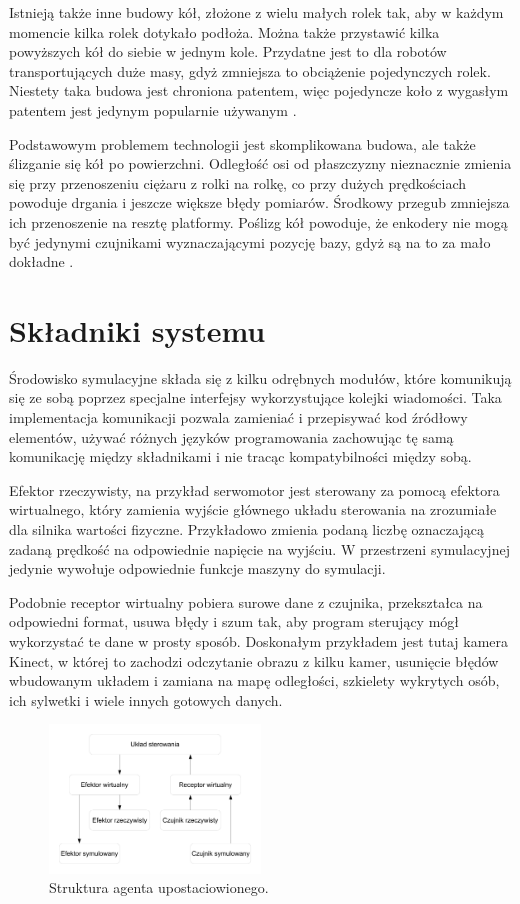 Istnieją także inne budowy kół, złożone z wielu małych rolek tak, aby w każdym momencie kilka rolek dotykało podłoża.
Można także przystawić kilka powyższych kół do siebie w jednym kole.
Przydatne jest to dla robotów transportujących duże masy, gdyż zmniejsza to obciążenie pojedynczych rolek.
Niestety taka budowa jest chroniona patentem, więc pojedyncze koło z wygasłym patentem jest jedynym popularnie używanym \cite{paletobot}.

Podstawowym problemem technologii jest skomplikowana budowa, ale także ślizganie się kół po powierzchni.
Odległość osi od płaszczyzny nieznacznie zmienia się przy przenoszeniu ciężaru z rolki na rolkę, co przy dużych prędkościach powoduje drgania i jeszcze większe błędy pomiarów.
Środkowy przegub zmniejsza ich przenoszenie na resztę platformy.
Poślizg kół powoduje, że enkodery nie mogą być jedynymi czujnikami wyznaczającymi pozycję bazy, gdyż są na to za mało dokładne \cite{heavy}.

\section{Składniki systemu}
Środowisko symulacyjne składa się z kilku odrębnych modułów, które komunikują się ze sobą poprzez specjalne interfejsy wykorzystujące kolejki wiadomości.
Taka implementacja komunikacji pozwala zamieniać i przepisywać kod źródłowy elementów, używać różnych języków programowania zachowując tę samą komunikację między składnikami i nie tracąc kompatybilności między sobą.

Efektor rzeczywisty, na przykład serwomotor jest sterowany za pomocą efektora wirtualnego, który zamienia wyjście głównego układu sterowania na zrozumiałe dla silnika wartości fizyczne. 
Przykładowo zmienia podaną liczbę oznaczającą zadaną prędkość na odpowiednie napięcie na wyjściu. W przestrzeni symulacyjnej jedynie wywołuje odpowiednie funkcje maszyny do symulacji.

Podobnie receptor wirtualny pobiera surowe dane z czujnika, przekształca na odpowiedni format, usuwa błędy i szum tak, aby program sterujący mógł wykorzystać te dane w prosty sposób. 
Doskonałym przykładem jest tutaj kamera Kinect, w której to zachodzi odczytanie obrazu z kilku kamer, usunięcie błędów wbudowanym układem i zamiana na mapę odległości, szkielety wykrytych osób, ich sylwetki i wiele innych gotowych danych.

\begin{figure}[H]
\centering
 \includegraphics[width=0.5\textwidth]{graphics/agent.pdf}
\caption{Struktura agenta upostaciowionego.}
\end{figure} 


